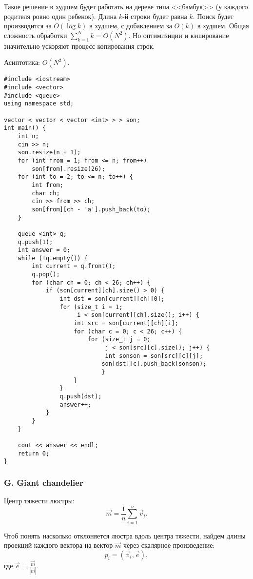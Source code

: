 Такое решение в худшем будет работать на дереве типа <<бамбук>> (у каждого родителя ровно один ребенок). Длина $k$-й строки будет равна $k$. Поиск будет производится за $O(\log{k})$ в худшем, с добавлением за $O(k)$ в худшем. Общая сложность обработки $\sum_{k=1}^{N} k = O(N^2)$. Но оптимизиции и кэширование значительно ускоряют процесс копирования строк.

Асиптотика: $O(N^2)$.



\begin{lstlisting}
#include <iostream>
#include <vector>
#include <queue>
using namespace std;

vector < vector < vector <int> > > son;
int main() {
    int n;
    cin >> n;
    son.resize(n + 1);
    for (int from = 1; from <= n; from++)
        son[from].resize(26);
    for (int to = 2; to <= n; to++) {
        int from;
        char ch;
        cin >> from >> ch;
        son[from][ch - 'a'].push_back(to);
    }

    queue <int> q;
    q.push(1);
    int answer = 0;
    while (!q.empty()) {
        int current = q.front();
        q.pop();
        for (char ch = 0; ch < 26; ch++) {
            if (son[current][ch].size() > 0) {
                int dst = son[current][ch][0];
                for (size_t i = 1; 
                     i < son[current][ch].size(); i++) {
                    int src = son[current][ch][i];
                    for (char c = 0; c < 26; c++) {
                        for (size_t j = 0; 
                             j < son[src][c].size(); j++) {
                             int sonson = son[src][c][j];
                            son[dst][c].push_back(sonson);
                            }
                    }
                }
                q.push(dst);
                answer++;
            }
        }
    }

    cout << answer << endl;
    return 0;
}
\end{lstlisting}



\subsubsection*{G. Giant chandelier}

Центр тяжести люстры:
$$\vec{m} = \frac{1}{n} \sum_{i = 1}^{n} \vec{v}_i.$$

Чтоб понять насколько отклоняется люстра вдоль центра тяжести, найдем длины проекций каждого вектора на вектор $\vec{m}$ через скалярное произведение:
$$p_i = (\vec{v}_i, \vec{e}),$$
где $\vec{e} = \frac{\vec{m}}{|\vec{m}|}$.

